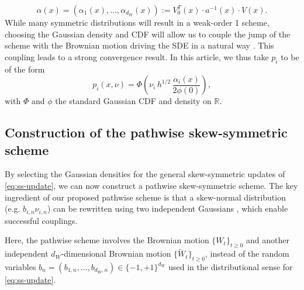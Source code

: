 \documentclass[11pt]{article}
\begin{document}
\begin{equation}\label{def:alpha}
    \alpha(x) = (\alpha_1(x) , \dots , \alpha_{d_W}(x)) := V_0^T(x) \cdot a^{-1}(x) \cdot V(x).
\end{equation}
While many symmetric distributions will result in a weak-order 1 scheme, choosing the Gaussian density and CDF will allow us to couple the jump of the scheme with the Brownian motion driving the SDE in a natural way \cite{Hen:86}. This coupling leads to a strong convergence result. In this article, we thus take $p_i$ to be of the form
\begin{equation} \label{eq:p-construction:Gaussian}
  p_i(x, \nu) = \Phi\!\left( \nu_i\, h^{1/2}\, \frac{\alpha_i(x)}{2 \phi(0)} \right),
\end{equation}
with $\Phi$ and $\phi$ the standard Gaussian CDF and density on $\mathbb{R}$.  %

\subsection{Construction of the pathwise skew-symmetric scheme} \label{sec:construction-pathwise-ss}

By selecting the Gaussian densities for the general skew-symmetric updates of \eqref{eq:ss-update}, we can now construct a pathwise skew-symmetric scheme. The key ingredient of our proposed pathwise scheme is that a skew-normal distribution (e.g. $b_{i,n} \nu_{i,n}$) can be rewritten using two independent Gaussians \cite{Hen:86}, which enable successful couplings.

Here, the pathwise scheme involves the Brownian motion $\{W_t \}_{t \ge 0}$ and another independent $d_W$-dimensional Brownian motion $\{ \widetilde{W}_t \}_{t \ge 0}$, instead of the random variables $b_{n} = (b_{1, n}, \ldots, b_{d_W, n}) \in \{-1,+1\}^{d_W}$ used in the distributional sense for \eqref{eq:ss-update}. %
\end{document}
